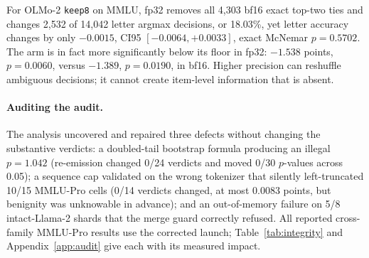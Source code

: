 For OLMo-2 \texttt{keep8} on MMLU, fp32 removes all 4,303 bf16 exact top-two ties and changes 2,532 of 14,042 letter argmax decisions, or 18.03\%, yet letter accuracy changes by only $-0.0015$, CI95 $[-0.0064,+0.0033]$, exact McNemar $p=0.5702$. The arm is in fact more significantly below its floor in fp32: $-1.538$ points, $p=0.0060$, versus $-1.389$, $p=0.0190$, in bf16. Higher precision can reshuffle ambiguous decisions; it cannot create item-level information that is absent.

\paragraph{Auditing the audit.}
The analysis uncovered and repaired three defects without changing the substantive verdicts: a doubled-tail bootstrap formula producing an illegal $p=1.042$ (re-emission changed 0/24 verdicts and moved 0/30 $p$-values across 0.05); a sequence cap validated on the wrong tokenizer that silently left-truncated 10/15 MMLU-Pro cells (0/14 verdicts changed, at most 0.0083 points, but benignity was unknowable in advance); and an out-of-memory failure on 5/8 intact-Llama-2 shards that the merge guard correctly refused. All reported cross-family MMLU-Pro results use the corrected launch; Table~\ref{tab:integrity} and Appendix~\ref{app:audit} give each with its measured impact.
